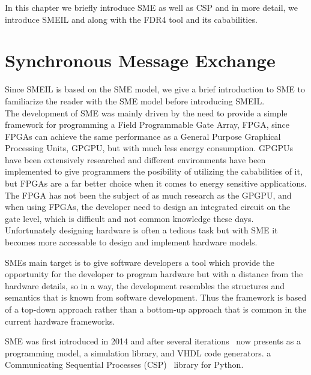 In this chapter we briefly introduce SME as well as CSP and in more detail, we introduce SMEIL and \cspm along with the FDR4 tool and its cababilities.

\section{Synchronous Message Exchange}
Since SMEIL is based on the SME model, we give a brief introduction to SME to familiarize the reader with the SME model before introducing SMEIL.
\\

The development of SME was mainly driven by the need to provide a simple framework for programming a Field Programmable Gate
Array, FPGA, since FPGAs can achieve the same performance as a General Purpose Graphical Processing Units, GPGPU, but with much less energy consumption. GPGPUs have been extensively researched and different environments have been implemented to give programmers the posibility of utilizing the cababilities of it, but FPGAs are a far better choice when it comes to energy sensitive applications. The FPGA has not been the subject of as much research as the GPGPU, and when using FPGAs, the developer need to design an integrated circuit on the gate level, which is difficult and not common knowledge these days.
Unfortunately designing hardware is often a tedious task but with SME it becomes more accessable to design and implement hardware models.

SMEs main target is to give software developers a tool which provide the opportunity for the developer to program hardware but with a distance from the hardware details, so in a way, the development resembles the structures and semantics that is known from software development.
Thus the framework is based of a top-down approach rather than a bottom-up approach that is common in the current hardware frameworks.

SME was first introduced in 2014 and after several iterations~\cite{Vinter2014, Vinter2015, Skovhede} now presents as a programming model, a simulation library, and VHDL code generators. %
a Communicating Sequential Processes (CSP)~\cite{hoare1978communicating} library for Python.\\

